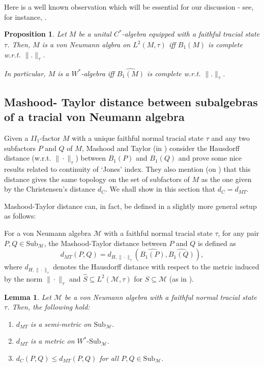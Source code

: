 \documentclass{amsart}
\numberwithin{equation}{section}
\newcommand{\1}{\mathbf{1}}
\newcommand{\mM}{\mathcal{M}}
\newtheorem{lemma}[theorem]{Lemma}
\newtheorem{proposition}[theorem]{Proposition}
\begin{document}
 Here is  a well known observation which will be essential
for our discussion - see, for instance, \cite[Proposition 2.6.4]{AP}.
\begin{proposition}\label{vNa-ball-complete}
  Let $M$ be a unital $C^{*}$-algebra equipped with a faithful tracial
  state $\tau$. Then, $M$ is a von Neumann algbra  on $L^{2}(M, \tau)$
  iff $\widehat{B_1(M)}$ is complete w.r.t. $\|.\|_{\tau}$.
  
In particular, $M$ is a $W^*$-algebra iff $\widehat{B_1(M)}$ is
complete w.r.t. $\|.\|_{\tau}$.
\end{proposition}

    
\subsection{Mashood- Taylor distance between subalgebras of a tracial von Neumann algebra}

Given a $II_1$-factor $M$ with a unique faithful normal tracial state
$\tau$ and any two subfactors $P$ and $Q$ of $M$, Mashood and Taylor
(in \cite{MT}) consider the Hausdorff distance
(w.r.t. $\|\cdot\|_{\tau}$) between ${B_1(P) }$ and
${B_1(Q)}$ and prove some nice results related to continuity
of `Jones' index. They also mention (on \cite[Page
  56]{MT}) that this distance gives the same topology on the set of
subfactors of $M$ as the one given by the Christensen's distance $d_C$. We shall
show in this section that  $d_C= d_{MT}$.


Mashood-Taylor  distance can, in fact, be defined in a slightly more
general setup as follows:

For a von Neumann algebra $\mM$ with a faithful normal tracial state $\tau$, for
any pair $P, Q \in \text{Sub}_\mM$, the Mashood-Taylor distance between
$P$ and $Q$ is defined as
\begin{equation}\label{dMT-expresssion}
d_{MT} (P, Q) = d_{H, \|\cdot\|_\tau } (\widehat{B_1(P)}, \widehat{B_1(Q)}),
\end{equation}
where $d_{H, \|\cdot\|_\tau}$ denotes the Hausdorff distance with
respect to the metric induced by the norm $\|\cdot\|_\tau$ and
$\widehat{S} \subseteq L^2(\mM, \tau)$ for $S \subseteq \mM$ (as in
). 


\begin{lemma}\label{dMT-facts}
  Let $\mM$ be a von Neumann algebra with a  faithful normal
  tracial state $\tau$. Then, the following hold:
\begin{enumerate}
\item  $d_{MT}$  is a semi-metric on $\mathrm{Sub}_{\mM}$.

\item $d_{MT}$ is a metric on $W^*\text{-}\mathrm{Sub}_{\mM}$. 

\item \(
d_C(P,Q)\leq d_{MT}(P,Q) 
\)    for all $P, Q \in \text{Sub}_{\mM}$.
 \end{enumerate}
\end{lemma}
\end{document}
